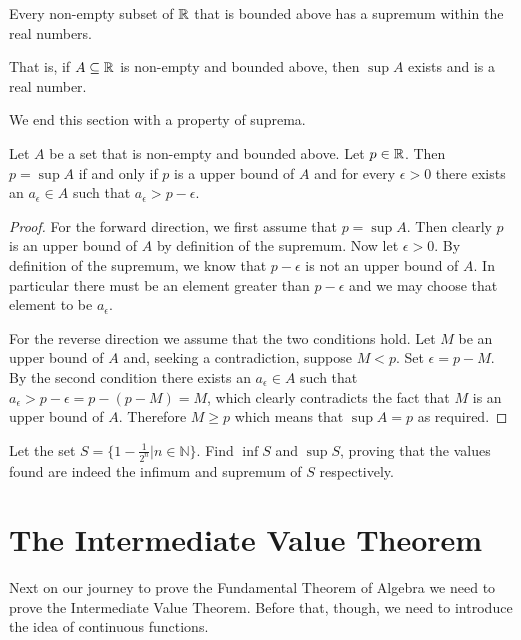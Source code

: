 \begin{axiom}[Completeness]\label{axiom-completeness}
    Every non-empty subset of $\mathbb{R}$ that is bounded above has a supremum within the real numbers.

    That is, if $A \subseteq \mathbb{R}$ is non-empty and bounded above, then $\sup A$ exists and is a real number.
\end{axiom}

We end this section with a property of suprema.
\begin{proposition}\label{prop-identifying-suprema}
    Let $A$ be a set that is non-empty and bounded above. Let $p \in \mathbb{R}$. Then $p = \sup A$ if and only if $p$ is a upper bound of $A$ and for every $\epsilon > 0$ there exists an $a_\epsilon \in A$ such that $a_\epsilon > p - \epsilon$.
\end{proposition}
\begin{proof}
    For the forward direction, we first assume that $p = \sup A$. Then clearly $p$ is an upper bound of $A$ by definition of the supremum. Now let $\epsilon > 0$. By definition of the supremum, we know that $p - \epsilon$ is not an upper bound of $A$. In particular there must be an element greater than $p - \epsilon$ and we may choose that element to be $a_\epsilon$.

    For the reverse direction we assume that the two conditions hold. Let $M$ be an upper bound of $A$ and, seeking a contradiction, suppose $M < p$. Set $\epsilon = p - M$. By the second condition there exists an $a_\epsilon \in A $ such that $a_\epsilon > p - \epsilon = p - (p - M) = M$, which clearly contradicts the fact that $M$ is an upper bound of $A$. Therefore $M \geq p$ which means that $\sup A = p$ as required.
\end{proof}

\begin{exercise}
    Let the set $S = \{1 - \frac1{2^n} \vert n \in \mathbb{N}\}$. Find $\inf S$ and $\sup S$, proving that the values found are indeed the infimum and supremum of $S$ respectively.
\end{exercise}

\section{The Intermediate Value Theorem}
Next on our journey to prove the Fundamental Theorem of Algebra we need to prove the Intermediate Value Theorem. Before that, though, we need to introduce the idea of continuous functions.

